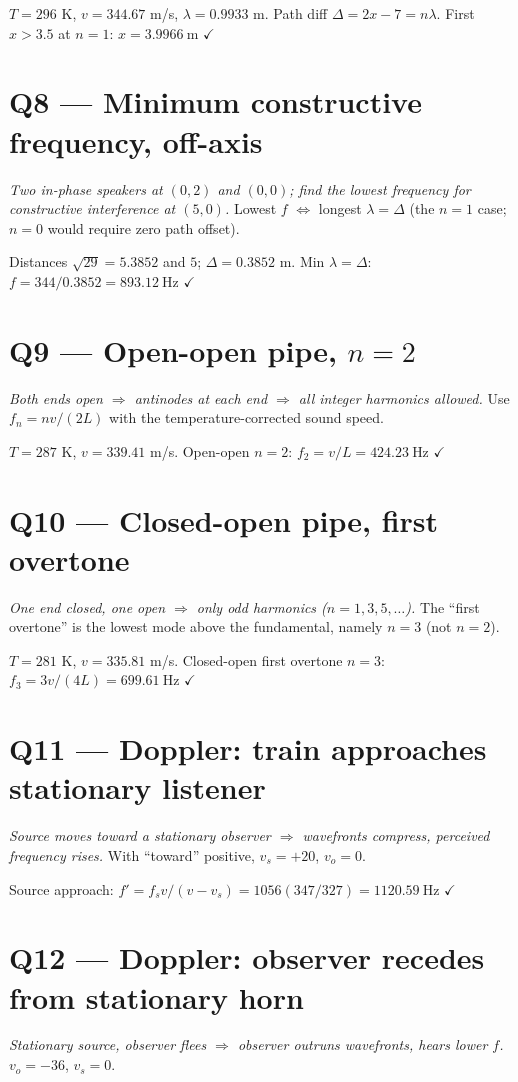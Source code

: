 \documentclass[11pt]{article}
\newcommand{\checkmk}{\ensuremath{\checkmark}}
\begin{document}
$T=296$ K, $v = 344.67$ m/s, $\lambda = 0.9933$ m. Path diff $\Delta = 2x-7 = n\lambda$. First $x>3.5$ at $n=1$: $x = \boxed{3.9966\ \text{m}}$ \checkmk

\section*{Q8 --- Minimum constructive frequency, off-axis}
\emph{Two in-phase speakers at $(0,2)$ and $(0,0)$; find the lowest frequency for constructive interference at $(5,0)$.} Lowest $f$ $\Leftrightarrow$ longest $\lambda = \Delta$ (the $n=1$ case; $n=0$ would require zero path offset).

Distances $\sqrt{29}=5.3852$ and $5$; $\Delta = 0.3852$ m. Min $\lambda=\Delta$: $f = 344/0.3852 = \boxed{893.12\ \text{Hz}}$ \checkmk

\section*{Q9 --- Open-open pipe, $n=2$}
\emph{Both ends open $\Rightarrow$ antinodes at each end $\Rightarrow$ all integer harmonics allowed.} Use $f_n=nv/(2L)$ with the temperature-corrected sound speed.

$T=287$ K, $v=339.41$ m/s. Open-open $n=2$: $f_2 = v/L = \boxed{424.23\ \text{Hz}}$ \checkmk

\section*{Q10 --- Closed-open pipe, first overtone}
\emph{One end closed, one open $\Rightarrow$ only odd harmonics ($n=1,3,5,\dots$).} The ``first overtone'' is the lowest mode above the fundamental, namely $n=3$ (not $n=2$).

$T=281$ K, $v=335.81$ m/s. Closed-open first overtone $n=3$: $f_3 = 3v/(4L) = \boxed{699.61\ \text{Hz}}$ \checkmk

\section*{Q11 --- Doppler: train approaches stationary listener}
\emph{Source moves toward a stationary observer $\Rightarrow$ wavefronts compress, perceived frequency rises.} With ``toward'' positive, $v_s=+20$, $v_o=0$.

Source approach: $f' = f_s v/(v-v_s) = 1056(347/327) = \boxed{1120.59\ \text{Hz}}$ \checkmk

\section*{Q12 --- Doppler: observer recedes from stationary horn}
\emph{Stationary source, observer flees $\Rightarrow$ observer outruns wavefronts, hears lower $f$.} $v_o=-36$, $v_s=0$.
\end{document}
